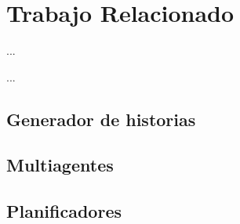 \chapter{Trabajo Relacionado}

\begin{FraseCelebre}
\begin{Frase}
...
\end{Frase}
\begin{Fuente}
...
\end{Fuente}
\end{FraseCelebre}


\section{Generador de historias}
\label{cap2:sec:relacionado}

\section{Multiagentes}

\section{Planificadores}

